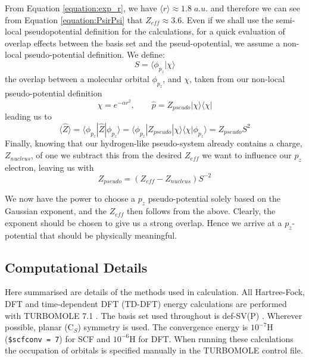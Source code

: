 \documentclass[journal=jctcce,manuscript=article]{achemso}
\begin{document}
From Equation \ref{equation:exp_r}, we have \( \langle r \rangle \approx 1.8\;a.u.\) and therefore we can see from Equation \ref{equation:PsirPsi} that \(Z_{eff} \approx 3.6\). Even if we shall use the semi-local pseudopotential definition for the calculations, for a quick evaluation of overlap effects between the basis set and the pseud-opotential, we assume a non-local pseudo-potential definition. We define:
\begin{equation}
S = \langle \phi_{p_{z}} | \chi \rangle
\end{equation}
the overlap between a molecular orbital \(\phi_{p_{z}}\), and \(\chi\), taken from our non-local pseudo-potential definition \cite{huzinaga_effective_1991}
\begin{equation}
\chi = e^{-\alpha r^{2}},\qquad \widehat{p} = Z_{pseudo} | \chi \rangle \langle \chi |
\end{equation}
leading us to
\begin{equation}
\langle \widehat{Z} \rangle = \langle \phi_{p_{z}} | \widehat{Z} | \phi_{p_{z}} \rangle = \langle \phi_{p_{z}} | Z_{pseudo} | \chi \rangle \langle \chi | \phi_{p_{z}} \rangle = Z_{pseudo} S^{2}
\end{equation}
Finally, knowing that our hydrogen-like pseudo-system already contains a charge, \(Z_{nucleus}\), of one we subtract this from the desired \(Z_{eff}\) we want to influence our \(p_{z}\) electron, leaving us with
\begin{equation}
Z_{pseudo} = (Z_{eff} - Z_{nucleus})S^{-2}
\end{equation}

We now have the power to choose a \(p_{z}\) pseudo-potential solely based on the Gaussian exponent, and the \(Z_{eff}\) then follows from the above. Clearly, the exponent should be chosen to give us a strong overlap. Hence we arrive at a \(p_{z}\)-potential that should be physically meaningful. 

\subsection{Computational Details}

Here summarised are details of the methods used in calculation. All Hartree-Fock, DFT and time-dependent DFT (TD-DFT) energy calculations are performed with TURBOMOLE 7.1 \cite{TURBOMOLE}. The basis set used throughout is def-SV(P) \cite{defsvp}. Wherever possible, planar (C\(_{S}\)) symmetry is used. The convergence energy is \(10^{-7}\)H (\texttt{\$scfconv = 7}) for SCF and \(10^{-6}\)H for DFT. When running these calculations the occupation of orbitals is specified manually in the TURBOMOLE control file.
\end{document}
